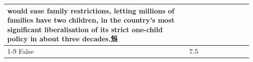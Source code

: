 \begin{table}[H]
\begin{tabular}{lllrlllll}
would ease family restrictions, letting millions of families have two children, in the country's most significant liberalisation of its strict one-child policy in about three decades.炰 \\
\cline{1-9}
False & 7.5%
\end{tabular}
\end{table}
